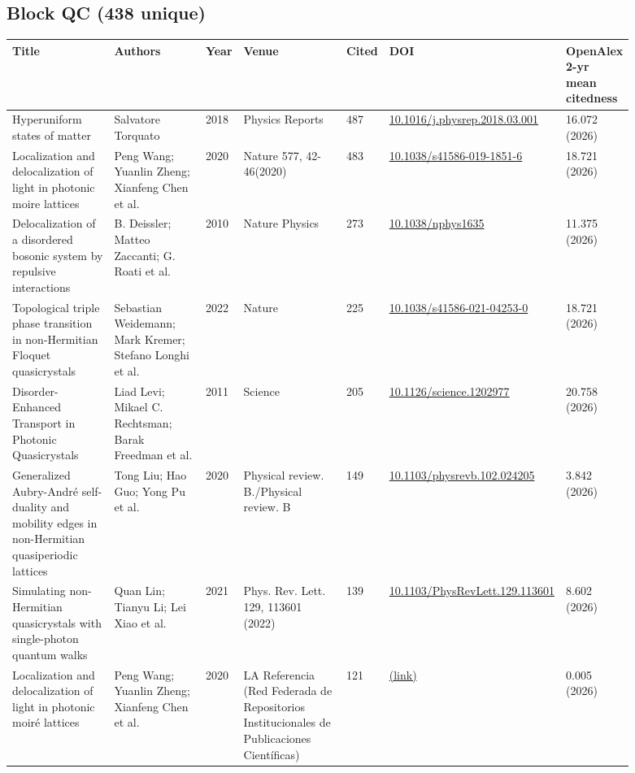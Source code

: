 \documentclass[10pt,a4paper]{article}
\begin{document}
\subsection*{Block QC (438 unique)}
{\scriptsize\begin{longtable}{p{0.204\linewidth}p{0.188\linewidth}p{0.043\linewidth}p{0.204\linewidth}p{0.043\linewidth}p{0.108\linewidth}p{0.102\linewidth}}
\hline
\textbf{Title} & \textbf{Authors} & \textbf{Year} & \textbf{Venue} & \textbf{Cited} & \textbf{DOI} & \textbf{OpenAlex 2-yr mean citedness} \\ \hline
\endhead
Hyperuniform states of matter & Salvatore Torquato & 2018 & Physics Reports & 487 & \href{https://doi.org/10.1016/j.physrep.2018.03.001}{10.1016/j.physrep.2018.03.001} & 16.072 (2026) \\
Localization and delocalization of light in photonic moire lattices & Peng Wang; Yuanlin Zheng; Xianfeng Chen et al. & 2020 & Nature 577, 42-46(2020) & 483 & \href{https://doi.org/10.1038/s41586-019-1851-6}{10.1038/s41586-019-1851-6} & 18.721 (2026) \\
Delocalization of a disordered bosonic system by repulsive interactions & B. Deissler; Matteo Zaccanti; G. Roati et al. & 2010 & Nature Physics & 273 & \href{https://doi.org/10.1038/nphys1635}{10.1038/nphys1635} & 11.375 (2026) \\
Topological triple phase transition in non-Hermitian Floquet quasicrystals & Sebastian Weidemann; Mark Kremer; Stefano Longhi et al. & 2022 & Nature & 225 & \href{https://doi.org/10.1038/s41586-021-04253-0}{10.1038/s41586-021-04253-0} & 18.721 (2026) \\
Disorder-Enhanced Transport in Photonic Quasicrystals & Liad Levi; Mikael C. Rechtsman; Barak Freedman et al. & 2011 & Science & 205 & \href{https://doi.org/10.1126/science.1202977}{10.1126/science.1202977} & 20.758 (2026) \\
Generalized Aubry-André self-duality and mobility edges in non-Hermitian quasiperiodic lattices & Tong Liu; Hao Guo; Yong Pu et al. & 2020 & Physical review. B./Physical review. B & 149 & \href{https://doi.org/10.1103/physrevb.102.024205}{10.1103/physrevb.102.024205} & 3.842 (2026) \\
Simulating non-Hermitian quasicrystals with single-photon quantum walks & Quan Lin; Tianyu Li; Lei Xiao et al. & 2021 & Phys. Rev. Lett. 129, 113601 (2022) & 139 & \href{https://doi.org/10.1103/PhysRevLett.129.113601}{10.1103/PhysRevLett.129.113601} & 8.602 (2026) \\
Localization and delocalization of light in photonic moiré lattices & Peng Wang; Yuanlin Zheng; Xianfeng Chen et al. & 2020 & LA Referencia (Red Federada de Repositorios Institucionales de Publicaciones Científicas) & 121 & \href{https://openalex.org/W3102201054}{(link)} & 0.005 (2026) \\

\end{longtable}}
\end{document}
